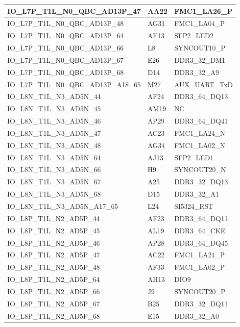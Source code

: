 \begin{footnotesize}
\begin{longtable}{|p{7cm}|p{1cm}|p{5cm}|}
IO\_L7P\_T1L\_N0\_QBC\_AD13P\_47	&	AA22	&	FMC1\_LA26\_P	\\ \hline
IO\_L7P\_T1L\_N0\_QBC\_AD13P\_48	&	AG31	&	FMC1\_LA04\_P	\\ \hline
IO\_L7P\_T1L\_N0\_QBC\_AD13P\_64	&	AE13	&	SFP2\_LED2	\\ \hline
IO\_L7P\_T1L\_N0\_QBC\_AD13P\_66	&	L8	&	SYNCOUT10\_P	\\ \hline
IO\_L7P\_T1L\_N0\_QBC\_AD13P\_67	&	E26	&	DDR3\_32\_DM1	\\ \hline
IO\_L7P\_T1L\_N0\_QBC\_AD13P\_68	&	D14	&	DDR3\_32\_A9	\\ \hline
IO\_L7P\_T1L\_N0\_QBC\_AD13P\_A18\_65	&	M27	&	AUX\_UART\_TxD	\\ \hline
IO\_L8N\_T1L\_N3\_AD5N\_44	&	AF24	&	DDR3\_64\_DQ13	\\ \hline
IO\_L8N\_T1L\_N3\_AD5N\_45	&	AM19	&	NC	\\ \hline
IO\_L8N\_T1L\_N3\_AD5N\_46	&	AP29	&	DDR3\_64\_DQ41	\\ \hline
IO\_L8N\_T1L\_N3\_AD5N\_47	&	AC23	&	FMC1\_LA24\_N	\\ \hline
IO\_L8N\_T1L\_N3\_AD5N\_48	&	AG34	&	FMC1\_LA02\_N	\\ \hline
IO\_L8N\_T1L\_N3\_AD5N\_64	&	AJ13	&	SFP2\_LED1	\\ \hline
IO\_L8N\_T1L\_N3\_AD5N\_66	&	H9	&	SYNCOUT20\_N	\\ \hline
IO\_L8N\_T1L\_N3\_AD5N\_67	&	A25	&	DDR3\_32\_DQ13	\\ \hline
IO\_L8N\_T1L\_N3\_AD5N\_68	&	D15	&	DDR3\_32\_A1	\\ \hline
IO\_L8N\_T1L\_N3\_AD5N\_A17\_65	&	L24	&	SI5324\_RST	\\ \hline
IO\_L8P\_T1L\_N2\_AD5P\_44	&	AF23	&	DDR3\_64\_DQ11	\\ \hline
IO\_L8P\_T1L\_N2\_AD5P\_45	&	AL19	&	DDR3\_64\_CKE	\\ \hline
IO\_L8P\_T1L\_N2\_AD5P\_46	&	AP28	&	DDR3\_64\_DQ45	\\ \hline
IO\_L8P\_T1L\_N2\_AD5P\_47	&	AC22	&	FMC1\_LA24\_P	\\ \hline
IO\_L8P\_T1L\_N2\_AD5P\_48	&	AF33	&	FMC1\_LA02\_P	\\ \hline
IO\_L8P\_T1L\_N2\_AD5P\_64	&	AH13	&	DIO9	\\ \hline
IO\_L8P\_T1L\_N2\_AD5P\_66	&	J9	&	SYNCOUT20\_P	\\ \hline
IO\_L8P\_T1L\_N2\_AD5P\_67	&	B25	&	DDR3\_32\_DQ11	\\ \hline
IO\_L8P\_T1L\_N2\_AD5P\_68	&	E15	&	DDR3\_32\_A0	\\ \hline

\end{longtable}
\end{footnotesize}
